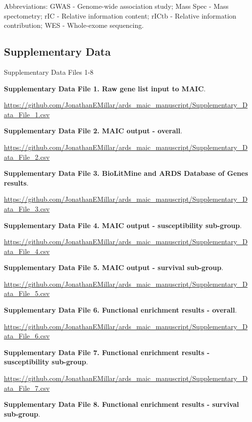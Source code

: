 \documentclass[
  11,
  a4paper,
]{article}
\begin{document}
\begin{scriptsize}
Abbreviations: GWAS - Genome-wide association study; Mass Spec - Mass spectometry; rIC - Relative information content; rICtb - Relative information contribution; WES - Whole-exome sequencing.
\end{scriptsize}

\newpage

\hypertarget{supplementary-data}{%
\subsection{Supplementary Data}\label{supplementary-data}}

Supplementary Data Files 1-8

\newpage

\textbf{Supplementary Data File 1. Raw gene list input to MAIC}.

\url{https://github.com/JonathanEMillar/ards_maic_manuscript/Supplementary_Data_File_1.csv}

\textbf{Supplementary Data File 2. MAIC output - overall}.

\url{https://github.com/JonathanEMillar/ards_maic_manuscript/Supplementary_Data_File_2.csv}

\textbf{Supplementary Data File 3. BioLitMine and ARDS Database of Genes
results}.

\url{https://github.com/JonathanEMillar/ards_maic_manuscript/Supplementary_Data_File_3.csv}

\textbf{Supplementary Data File 4. MAIC output - susceptibility
sub-group}.

\url{https://github.com/JonathanEMillar/ards_maic_manuscript/Supplementary_Data_File_4.csv}

\textbf{Supplementary Data File 5. MAIC output - survival sub-group}.

\url{https://github.com/JonathanEMillar/ards_maic_manuscript/Supplementary_Data_File_5.csv}

\textbf{Supplementary Data File 6. Functional enrichment results -
overall}.

\url{https://github.com/JonathanEMillar/ards_maic_manuscript/Supplementary_Data_File_6.csv}

\textbf{Supplementary Data File 7. Functional enrichment results -
susceptibility sub-group}.

\url{https://github.com/JonathanEMillar/ards_maic_manuscript/Supplementary_Data_File_7.csv}

\textbf{Supplementary Data File 8. Functional enrichment results -
survival sub-group}.
\end{document}
